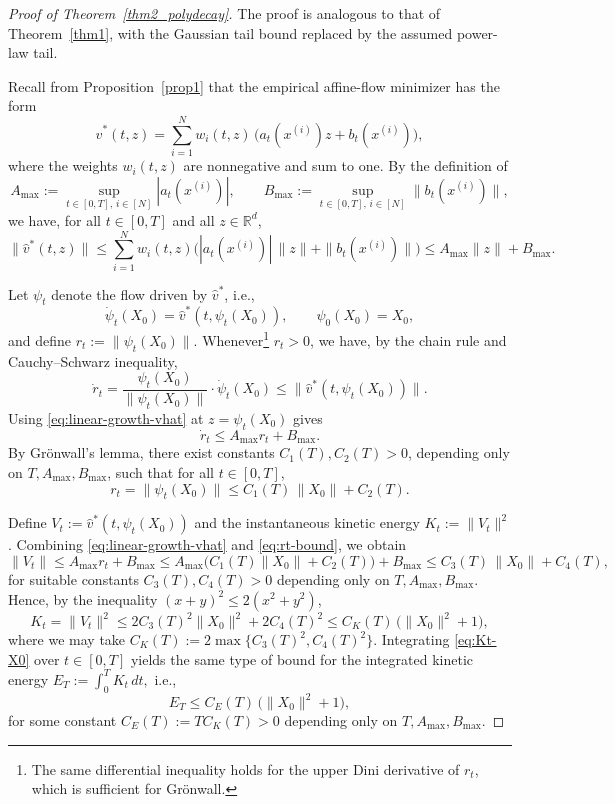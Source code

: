 \documentclass[10pt,a4paper]{amsart}
\begin{document}
\begin{proof}[Proof of Theorem~\ref{thm2_polydecay}]
The proof is analogous to that of Theorem~\ref{thm1}, with the Gaussian
tail bound replaced by the assumed power-law tail.

Recall from Proposition~\ref{prop1} that the empirical affine-flow minimizer
has the form
\[
\hat v^\ast(t,z)
= \sum_{i=1}^N w_i(t,z)\,\big(a_t(x^{(i)}) z + b_t(x^{(i)})\big),
\]
where the weights \(w_i(t,z)\) are nonnegative and sum to one. By the definition of
\[
A_{\max} := \sup_{t\in[0,T],\,i\in[N]} |a_t(x^{(i)})|,
\qquad
B_{\max} := \sup_{t\in[0,T],\,i\in[N]} \|b_t(x^{(i)})\|,
\]
we have, for all \(t \in [0,T]\) and all \(z \in \mathbb{R}^d\),
\begin{equation}
\label{eq:linear-growth-vhat}
\|\hat v^\ast(t,z)\|
\le \sum_{i=1}^N w_i(t,z)\big(|a_t(x^{(i)})|\,\|z\| + \|b_t(x^{(i)})\|\big)
\le A_{\max}\|z\| + B_{\max}.
\end{equation}

Let \(\psi_t\) denote the flow driven by \(\hat v^\ast\), i.e.,
\[
\dot\psi_t(X_0) = \hat v^\ast(t,\psi_t(X_0)), 
\qquad \psi_0(X_0) = X_0,
\]
and define \(r_t := \|\psi_t(X_0)\|\). Whenever\footnote{The same differential inequality holds for the upper Dini derivative of \(r_t\), which is sufficient for Grönwall.} \(r_t > 0\), we have, by the chain rule and
Cauchy--Schwarz inequality,
\[
\dot r_t
= \frac{\psi_t(X_0)}{\|\psi_t(X_0)\|} \cdot \dot\psi_t(X_0)
\le \|\hat v^\ast(t,\psi_t(X_0))\|.
\]
Using \eqref{eq:linear-growth-vhat} at \(z = \psi_t(X_0)\) gives
\[
\dot r_t
\le A_{\max} r_t + B_{\max}.
\]
By Grönwall’s lemma, there exist constants \(C_1(T), C_2(T) > 0\), depending only on
\(T, A_{\max}, B_{\max}\), such that for all \(t \in [0,T]\),
\begin{equation}
\label{eq:rt-bound}
r_t = \|\psi_t(X_0)\|
\le C_1(T)\,\|X_0\| + C_2(T).
\end{equation}

Define \(V_t := \hat v^\ast(t,\psi_t(X_0))\) and the instantaneous kinetic energy
\(K_t := \|V_t\|^2\). Combining \eqref{eq:linear-growth-vhat} and \eqref{eq:rt-bound},
we obtain
\[
\|V_t\|
\le A_{\max} r_t + B_{\max}
\le A_{\max}\big(C_1(T)\|X_0\| + C_2(T)\big) + B_{\max}
\le C_3(T)\,\|X_0\| + C_4(T),
\]
for suitable constants \(C_3(T), C_4(T) > 0\) depending only on \(T, A_{\max}, B_{\max}\).
Hence, by the inequality \((x+y)^2 \le 2(x^2 + y^2)\),
\begin{equation}
\label{eq:Kt-X0}
K_t
= \|V_t\|^2
\le 2C_3(T)^2\|X_0\|^2 + 2C_4(T)^2
\le C_K(T)\,\big(\|X_0\|^2 + 1\big),
\end{equation}
where we may take \(C_K(T) := 2\max\{C_3(T)^2, C_4(T)^2\}\).
Integrating \eqref{eq:Kt-X0} over \(t \in [0,T]\) yields the same type of bound
for the integrated kinetic energy
$E_T := \int_0^T K_t\,dt,$
i.e.,
\begin{equation}
\label{eq:ET-X0}
E_T
\le C_E(T)\,\big(\|X_0\|^2 + 1\big),
\end{equation}
for some constant \(C_E(T) := T C_K(T) > 0\) depending only on \(T, A_{\max}, B_{\max}\).


\end{proof}
\end{document}
